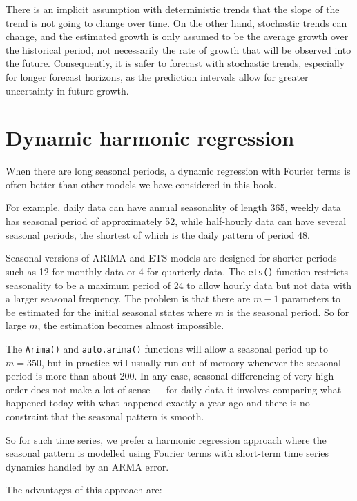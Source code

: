 \documentclass[]{book}
\begin{document}
There is an implicit assumption with deterministic trends that the slope of the trend is not going to change over time. On the other hand, stochastic trends can change, and the estimated growth is only assumed to be the average growth over the historical period, not necessarily the rate of growth that will be observed into the future. Consequently, it is safer to forecast with stochastic trends, especially for longer forecast horizons, as the prediction intervals allow for greater uncertainty in future growth.

\hypertarget{sec-dhr}{%
\section{Dynamic harmonic regression}\label{sec-dhr}}

When there are long seasonal periods, a dynamic regression with Fourier terms is often better than other models we have considered in this book.

For example, daily data can have annual seasonality of length 365, weekly data has seasonal period of approximately 52, while half-hourly data can have several seasonal periods, the shortest of which is the daily pattern of period 48.

Seasonal versions of ARIMA and ETS models are designed for shorter periods such as 12 for monthly data or 4 for quarterly data. The \texttt{ets()} function restricts seasonality to be a maximum period of 24 to allow hourly data but not data with a larger seasonal frequency. The problem is that there are \(m-1\) parameters to be estimated for the initial seasonal states where \(m\) is the seasonal period. So for large \(m\), the estimation becomes almost impossible.

The \texttt{Arima()} and \texttt{auto.arima()} functions will allow a seasonal period up to \(m=350\), but in practice will usually run out of memory whenever the seasonal period is more than about 200. In any case, seasonal differencing of very high order does not make a lot of sense --- for daily data it involves comparing what happened today with what happened exactly a year ago and there is no constraint that the seasonal pattern is smooth.

So for such time series, we prefer a harmonic regression approach where the seasonal pattern is modelled using Fourier terms with short-term time series dynamics handled by an ARMA error.

The advantages of this approach are:
\end{document}
